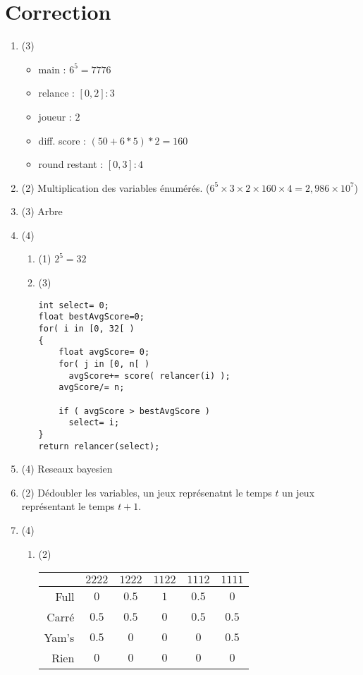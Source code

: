 \documentclass[a4paper, 10pt]{article}
\begin{document}
  \newpage
  
  \section*{Correction}%
  
    \begin{enumerate}[Q1]
     \item (3)
      \begin{itemize}
       \item main : $6^5 = 7776$
       \item relance : $[0, 2] : 3$
       \item joueur : $2$
       \item diff. score : $ (50+6*5) * 2 = 160$
       \item round restant : $[0, 3] : 4$
      \end{itemize}

     \item (2) Multiplication des variables énumérés. ($6^5\times3\times2\times160\times4 = 2,986\times 10^7$)
     \item (3) Arbre
     \item (4) 
     
      \begin{enumerate}[a]
      \item (1) $2^5= 32$
      \item (3) 
      \begin{lstlisting}[caption={Script IA-1}]
int select= 0;
float bestAvgScore=0;
for( i in [0, 32[ )
{
    float avgScore= 0;
    for( j in [0, n[ )
      avgScore+= score( relancer(i) );
    avgScore/= n;
    
    if ( avgScore > bestAvgScore )
      select= i;
}
return relancer(select);
      \end{lstlisting}
      \end{enumerate}
	
     \item (4) Reseaux bayesien
     \item (2) Dédoubler les variables, un jeux représenatnt le temps $t$ un jeux représentant le temps $t+1$.
     \item (4) 
      
      \begin{enumerate}[a]
      \item (2)
     \small
    \begin{tabular}{|r|c|c| c|c|c|}
      \hline
      & $2222$ & $1222$ & $1122$ & $1112$ & $1111$ \\
      \hline
      Full  & $0  $ & $0.5$ & $1$ & $0.5$ & $0   $ \\
      Carré & $0.5$ & $0.5$ & $0$ & $0.5$ & $0.5 $ \\
      Yam's & $0.5$ & $0  $ & $0$ & $0  $ & $0.5 $ \\
      Rien  & $0  $ & $0  $ & $0$ & $0  $ & $0   $ \\
      \hline
    \end{tabular}
    

\end{enumerate}
\end{enumerate}
\end{document}
